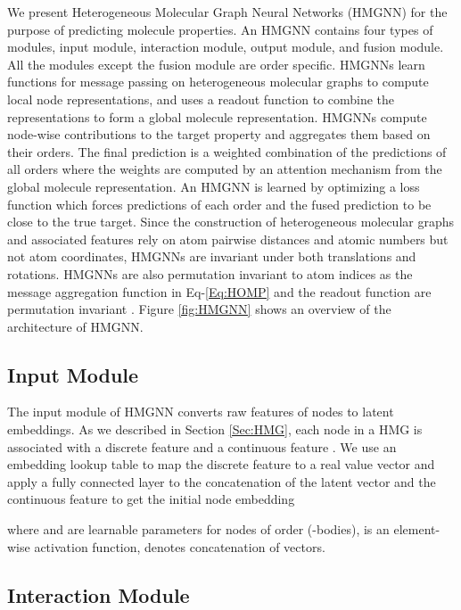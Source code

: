 \documentclass[conference]{IEEEtran}
\begin{document}
We present Heterogeneous Molecular Graph Neural Networks (HMGNN) for the purpose of predicting molecule properties. An HMGNN contains four types of modules, input module, interaction module, output module, and fusion module. All the modules except the fusion module are order specific. HMGNNs learn functions for message passing on heterogeneous molecular graphs to compute local node representations, and uses a readout function to combine the representations to form a global molecule representation. HMGNNs compute node-wise contributions to the target property and aggregates them based on their orders. The final prediction is a weighted combination of the predictions of all orders where the weights are computed by an attention mechanism from the global molecule representation. An HMGNN is learned by optimizing a loss function which forces predictions of each order and the fused prediction to be close to the true target. Since the construction of heterogeneous molecular graphs and associated features rely on atom pairwise distances and atomic numbers but not atom coordinates, HMGNNs are invariant under both translations and rotations. HMGNNs are also permutation invariant to atom indices as the message aggregation function in Eq-\ref{Eq:HOMP} and the readout function are permutation invariant \cite{xu2018how}. Figure \ref{fig:HMGNN} shows an overview of the architecture of HMGNN.



\subsection{Input Module}

The input module of HMGNN converts raw features of nodes to latent embeddings. As we described in Section \ref{Sec:HMG}, each node  in a HMG is associated with a discrete feature  and a continuous feature . We use an embedding lookup table to map the discrete feature  to a real value vector  and apply a fully connected layer to the concatenation of the latent vector  and the continuous feature  to get the initial node embedding

where  and  are learnable parameters for nodes of order  (-bodies),  is an element-wise activation function,  denotes concatenation of vectors.

\subsection{Interaction Module}
\end{document}
